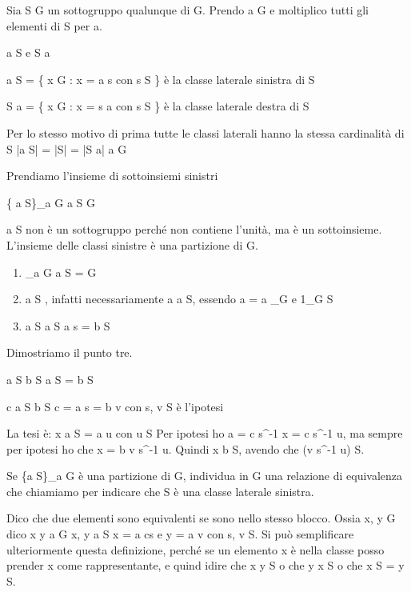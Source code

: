 Sia S \le G un sottogruppo qualunque di G. Prendo a \in G e moltiplico tutti gli elementi di S per a.

a \cdot S e S \cdot a

a \cdot S = \{ x \in G : x = a \cdot s con s \in S \} \`e la classe laterale sinistra di S

S \cdot a = \{ x \in G : x = s \cdot a con s \in S \} \`e la classe laterale destra di S

Per lo stesso motivo di prima tutte le classi laterali hanno la stessa cardinalit\`a di S |a \cdot S| = |S| = |S \cdot a| \forall a \in G

Prendiamo l'insieme di sottoinsiemi sinistri

\{ a \cdot S\}_{a \in G} a \cdot S \subseteq G

a \cdot S non \`e un sottogruppo perch\'e non contiene l'unit\`a, ma \`e un sottoinsieme. L'insieme delle classi sinistre \`e una partizione di G.
\begin{enumerate}
    \item \bigcup_{a \in G} a \cdot S = G
    \item a \cdot S \neq \emptyset, infatti necessariamente a \in a \cdot S, essendo a = a _G e 1_G \in S
    \item a \cdot S \cap a \cdot S \neq \emptyset \Rightarrow a \cdot s = b \cdot S
\end{enumerate}
Dimostriamo il punto tre.

a \cdot S \cap b \cdot S \neq \emptyset \Rightarrow a \cdot S = b \cdot S

c \in a \cdot S \cap b \cdot S
c = a \cdot s = b \cdot v con s, v \in S
\`e l'ipotesi

La tesi \`e:
x \in a \cdot S \Rightarrow = a \cdot u con u \in S
Per ipotesi ho a = c \cdot s^{-1} \Rightarrow x = c \cdot s^{-1} \cdot u, ma sempre per ipotesi ho che x = b \cdot v \cdot s^{-1} \cdot u. Quindi x \in b \cdot S, avendo che (v \cdot s^{-1} \cdot u) \in S.

Se \{a \cdot S\}_{a \in G} \`e una partizione di G, individua in G una relazione di equivalenza che chiamiamo %
per indicare che S \`e una classe laterale sinistra.

Dico che due elementi sono equivalenti se sono nello stesso blocco. Ossia x, y \in G dico x \equiv y \Leftrightarrow \exists a \in G x, y \in a \cdot S \Leftrightarrow x = a c\dot s e y = a \cdot v con s, v \in S. Si pu\`o semplificare ulteriormente questa definizione, perch\'e se un elemento x \`e nella classe posso prender x come rappresentante, e quind idire che x \in y \cdot S o che y \in x \cdot S o che x \cdot S = y \cdot S.

